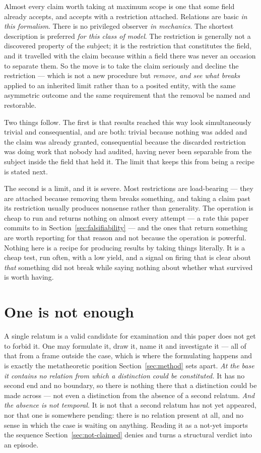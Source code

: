 \documentclass[11pt,a4paper]{article}
\begin{document}
Almost every claim worth taking at maximum scope is one that some field already accepts, and accepts
with a restriction attached. Relations are basic \emph{in this formalism}. There is no privileged
observer \emph{in mechanics}. The shortest description is preferred \emph{for this class of model}.
The restriction is generally not a discovered property of the subject; it is the restriction that
constitutes the field, and it travelled with the claim because within a field there was never an
occasion to separate them. So the move is to take the claim seriously and decline the restriction ---
which is not a new procedure but \emph{remove, and see what breaks} applied to an inherited limit
rather than to a posited entity, with the same asymmetric outcome and the same requirement that the
removal be named and restorable.

Two things follow. The
first is that results reached this way look simultaneously trivial and consequential, and are both:
trivial because nothing was added and the claim was already granted, consequential because the
discarded restriction was doing work that nobody had audited, having never been separable from the
subject inside the field that held it. The limit that keeps this from being a recipe is stated next.

The second is a limit, and it is severe. Most restrictions are load-bearing --- they are attached
because removing them breaks something, and taking a claim past its restriction usually produces
nonsense rather than generality. The operation is cheap to run and returns nothing on almost every
attempt --- a rate this paper commits to in Section~\ref{sec:falsifiability} --- and the ones that
return something are worth reporting for that reason and not because
the operation is powerful. Nothing here is a recipe for producing results by taking things literally.
It is a cheap test, run often, with a low yield, and a signal on firing that is clear about \emph{that}
something did not break while saying nothing about whether what survived is worth having.

\section{One is not enough}\label{sec:one-not-enough}
A single relatum is a valid candidate for examination and this paper does not get to forbid it. One
may formulate it, draw it, name it and investigate it --- all of that from a frame outside the case,
which is where the formulating happens and is exactly the metatheoretic position
Section~\ref{sec:method} sets apart. \emph{At the base it contains no relation from which a distinction
could be constituted.} It has no second end and no boundary, so there is nothing there that a
distinction could be made across --- not even a distinction from the absence of a second relatum.
\emph{And the absence is not temporal.} It is not that a second relatum has not yet appeared, nor that
one is somewhere pending: there is no relation present at all, and no sense in which the case is
waiting on anything. Reading it as a not-yet imports the sequence Section~\ref{sec:not-claimed} denies
and turns a structural verdict into an episode.
\end{document}
